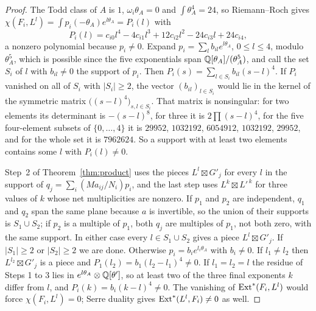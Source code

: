 \begin{proof}
The Todd class of $A$ is $1$, $\omega_{i}\theta_{A}=0$ and $\int\theta_{A}^{4}=24$, so Riemann--Roch gives $\chi(F_{i},L^{l})=\int p_{i}(-\theta_{A})e^{l\theta_{A}}=P_{i}(l)$ with
\begin{equation}\label{eq:rrpoly}
P_{i}(l)=c_{i0}l^{4}-4c_{i1}l^{3}+12c_{i2}l^{2}-24c_{i3}l+24c_{i4},
\end{equation}
a nonzero polynomial because $p_{i}\ne0$. Expand $p_{i}=\sum_{l}b_{il}e^{l\theta_{A}}$, $0\le l\le4$, modulo $\theta_{A}^{5}$, which is possible since the five exponentials span $\mathbb{Q}[\theta_{A}]/(\theta_{A}^{5})$, and call the set $S_{i}$ of $l$ with $b_{il}\ne0$ the support of $p_{i}$. Then $P_{i}(s)=\sum_{l\in S_{i}}b_{il}(s-l)^{4}$. If $P_{i}$ vanished on all of $S_{i}$ with $|S_{i}|\ge2$, the vector $(b_{il})_{l\in S_{i}}$ would lie in the kernel of the symmetric matrix $\bigl((s-l)^{4}\bigr)_{s,l\in S_{i}}$. That matrix is nonsingular: for two elements its determinant is $-(s-l)^{8}$, for three it is $2\prod(s-l)^{4}$, for the five four-element subsets of $\{0,\dots,4\}$ it is $29952$, $1032192$, $6054912$, $1032192$, $29952$, and for the whole set it is $7962624$. So a support with at least two elements contains some $l$ with $P_{i}(l)\ne0$.

Step~2 of Theorem~\ref{thm:product} uses the pieces $L^{l}\boxtimes G'_{j}$ for every $l$ in the support of $q_{j}=\sum_{i}(Ma_{ij}/N_{i})p_{i}$, and the last step uses $L^{k}\boxtimes L'^{\,k}$ for three values of $k$ whose net multiplicities are nonzero. If $p_{1}$ and $p_{2}$ are independent, $q_{1}$ and $q_{2}$ span the same plane because $a$ is invertible, so the union of their supports is $S_{1}\cup S_{2}$; if $p_{2}$ is a multiple of $p_{1}$, both $q_{j}$ are multiples of $p_{1}$, not both zero, with the same support. In either case every $l\in S_{1}\cup S_{2}$ gives a piece $L^{l}\boxtimes G'_{j}$. If $|S_{1}|\ge2$ or $|S_{2}|\ge2$ we are done. Otherwise $p_{i}=b_{i}e^{l_{i}\theta_{A}}$ with $b_{i}\ne0$. If $l_{1}\ne l_{2}$ then $L^{l_{2}}\boxtimes G'_{j}$ is a piece and $P_{1}(l_{2})=b_{1}(l_{2}-l_{1})^{4}\ne0$. If $l_{1}=l_{2}=l$ the residue of Steps 1 to 3 lies in $e^{l\theta_{A}}\otimes\mathbb{Q}[\theta']$, so at least two of the three final exponents $k$ differ from $l$, and $P_{i}(k)=b_{i}(k-l)^{4}\ne0$. The vanishing of $\mathrm{Ext}^{*}(F_{i},L^{l})$ would force $\chi(F_{i},L^{l})=0$; Serre duality gives $\mathrm{Ext}^{*}(L^{l},F_{i})\ne0$ as well.
\end{proof}

